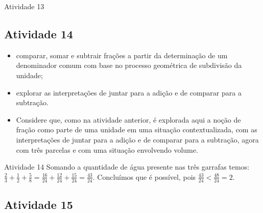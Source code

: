 \begin{multicols}{2}
\begin{resposta*}{Atividade 13}
\begin{enumerate} [\quad a)]
\end{enumerate} %

\end{resposta*}

\subsection{Atividade 14}

  \newline \vspace{.15cm}

  \begin{itemize} %
    \item       comparar, somar e subtrair frações a partir da determinação de um denominador comum com base no processo geométrica de subdivisão da unidade;
    \item       explorar as interpretações de juntar para a adição e de comparar para a subtração.
\end{itemize} %

   \vspace{.15cm}

  \begin{itemize} %
    \item       Considere que, como na atividade anterior, é explorada aqui a noção de fração como parte de uma unidade em uma situação contextualizada, com as interpretações de juntar para a adição e de comparar para a subtração, agora com três parcelas e com uma situação envolvendo volume.
\end{itemize} %
  \clearpage

\begin{resposta*}{Atividade 14}
  Somando a quantidade de água presente nas três garrafas temos:   $\frac{2}{3}+\frac{1}{2}+\frac{5}{8} = \frac{16}{24}+\frac{12}{24}+\frac{15}{24} = \frac{43}{24}$. Concluímos que é possível, pois   $\frac{43}{24}<\frac{48}{24}=2$.
\end{resposta*}



\subsection{Atividade 15}

  \newline \vspace{.15cm}


\end{multicols}
